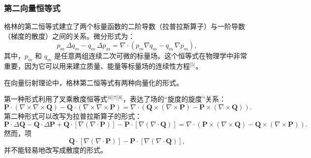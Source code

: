 \subsubsection{第二向量恒等式}
格林的第二恒等式建立了两个标量函数的二阶导数（拉普拉斯算子）与一阶导数（梯度的散度）之间的关系。微分形式为：
$$
p_{m}\,\Delta q_{m} - q_{m}\,\Delta p_{m} = \nabla \cdot \left(p_{m}\nabla q_{m} - q_{m}\,\nabla p_{m}\right),~
$$
其中，$p_{m}$ 和 $q_{m}$ 是任意两组连续二次可微的标量场。这个恒等式在物理学中非常重要，因为它可以用来建立质量、能量等标量场的连续性方程\(^\text{[5]}\)。

在向量衍射理论中，格林第二恒等式有两种向量化的形式。

第一种形式利用了叉乘散度恒等式\(^\text{[6][7][8]}\)，表达了场的“旋度的旋度”关系：
$$
\mathbf{P} \cdot (\nabla \times \nabla \times \mathbf{Q})
- \mathbf{Q} \cdot (\nabla \times \nabla \times \mathbf{P})
= \nabla \cdot \left(\mathbf{Q} \times (\nabla \times \mathbf{P})
- \mathbf{P} \times (\nabla \times \mathbf{Q})\right).~
$$
第二种形式可以改写为拉普拉斯算子的形式：
$$
\mathbf{P} \cdot \Delta \mathbf{Q} 
- \mathbf{Q} \cdot \Delta \mathbf{P} 
+ \mathbf{Q} \cdot [\nabla (\nabla \cdot \mathbf{P})]
- \mathbf{P} \cdot [\nabla (\nabla \cdot \mathbf{Q})]
= 
\nabla \cdot \left(\mathbf{P} \times (\nabla \times \mathbf{Q})
- \mathbf{Q} \times (\nabla \times \mathbf{P})\right).~
$$
然而，项
$$
\mathbf{Q} \cdot \left[\nabla \left(\nabla \cdot \mathbf{P} \right)\right]
-\mathbf{P} \cdot \left[\nabla \left(\nabla \cdot \mathbf{Q} \right)\right],~
$$
并不能轻易地改写成散度的形式。

